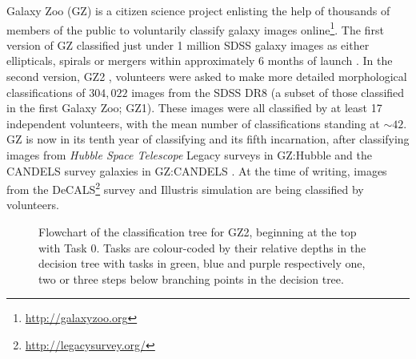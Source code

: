 Galaxy Zoo (GZ) is a citizen science project enlisting the help of thousands of members of the public to voluntarily classify galaxy images online\footnote{\url{http://galaxyzoo.org}}. The first version of GZ classified just under 1 million SDSS galaxy images as either ellipticals, spirals or mergers within approximately 6 months of launch \citep{lintott08, Lintott11}. In the second version, GZ2 \citep{GZ2}, volunteers were asked to make more detailed morphological classifications of $304, 022$ images from the SDSS DR8 (a subset of those classified in the first Galaxy Zoo; GZ1). These images were all classified by at least 17 independent volunteers, with the mean number of classifications standing at $\sim42$. GZ is now in its tenth year of classifying and its fifth incarnation, after classifying images from \emph{Hubble Space Telescope} Legacy surveys in GZ:Hubble \citep{willett16} and the CANDELS survey galaxies in GZ:CANDELS \citep{simmons16}. At the time of writing, images from the DeCALS\footnote{\url{http://legacysurvey.org/}} survey and Illustris simulation \citep{vogelsberger14, genel14} are being classified by volunteers. 

\begin{figure}
\caption[GZ2 classification decision tree]{Flowchart of the classification tree for GZ2, beginning at the top with Task 0. Tasks are colour-coded by their relative depths in the decision tree with tasks in green, blue and purple respectively one, two or three steps below branching points in the decision tree.}
\label{fig:gztree}
\end{figure}

